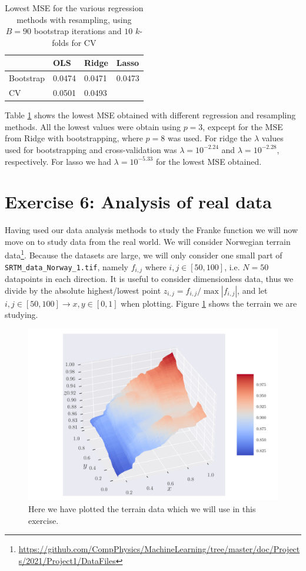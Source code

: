 \documentclass[reprint,english,notitlepage,aps,nobalancelastpage,nofootinbib]{revtex4-1}  %
\begin{document}
\begin{table}[h]
\begin{tabular}{llll}
\hline
 & OLS & Ridge & Lasso \\ \hline
Bootstrap & 0.0474 & 0.0471 & 0.0473 \\ \hline
CV & 0.0501 & 0.0493 &  \\ \hline
\end{tabular}
\caption{Lowest MSE for the various regression methods with resampling, using $B=90$ bootstrap iterations and $10$ $k$-folds for CV}
\label{tab:franke_mse}
\end{table}
Table \ref{tab:franke_mse} shows the lowest MSE obtained with different regression and resampling methods. All the lowest values were obtain using $p=3$, expcept for the MSE from Ridge with bootstrapping, where $p=8$ was used. For ridge the $\lambda$ values used for bootstrapping and cross-validation was $\lambda=10^{-2.24}$ and $\lambda=10^{-2.28}$, respectively. For lasso we had $\lambda=10^{-5.33}$ for the lowest MSE obtained.


\clearpage
\section*{Exercise 6: Analysis of real data}
Having used our data analysis methods to study the Franke function we will now move on to study data from the real world. We will consider Norwegian terrain data\footnote{\href{https://github.com/CompPhysics/MachineLearning/tree/master/doc/Projects/2021/Project1/DataFiles}{https://github.com/CompPhysics/MachineLearning/tree/master/doc/Projects/2021/Project1/DataFiles}}. Because the datasets are large, we will only consider one small part of \texttt{SRTM\_data\_Norway\_1.tif}, namely $f_{i,j}$ where $i,j\in[50,100]$, i.e. $N=50$ datapoints in each direction. It is useful to consider dimensionless data, thus we divide by the absolute highest/lowest point $z_{i,j} = f_{i,j}/\max{|f_{i,j}|}$, and let $i,j\in[50,100] \rightarrow x,y\in[0,1]$ when plotting. Figure \ref{fig:terrain_raw} shows the terrain we are studying.

\begin{figure}[h]
	\includegraphics[width=\linewidth]{SRTM_rawdata_n50.pdf}
	\caption{Here we have plotted the terrain data which we will use in this exercise.}
	\label{fig:terrain_raw}
\end{figure}
\end{document}
